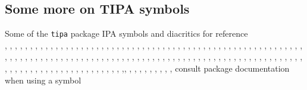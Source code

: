 \subsection{Some more on TIPA symbols}
\pex Some of the \verb=tipa= package IPA symbols and diacritics for reference\\
\a \textbabygamma, \textglotstop, \textrtailn, \textbarb, \texthalflength, \textrtailr, \textbarc, \texthardsign, \textrtails, \textbard, \texthooktop, \textrtailt, \textbardotlessj, \texthtb, \textrtailz, \textbarg, \texthtbardotlessj, \textrthook, \textbarglotstop, \texthtc, \textsca, \textbari, \texthtd, \textscb, \textbarl, \texthtg, \textsce, \textbaro, \texthth, \textscg, \textbarrevglotstop, \texththeng, \textsch, \textbaru, \texthtk, \textschwa, \textbeltl, \texthtp, \textsci, \textbeta, \texthtq, \textscj, \textbullseye, \texthtrtaild, \textscl, \textceltpal, \texthtscg, \textscn, \textchi, \texthtt, \textscoelig, \textcloseepsilon, \texthvlig, \textscomega, \textcloseomega, \textinvglotstop, \textscr, \textcloserevepsilon, \textinvscr, \textscripta, \textcommatailz, \textiota, \textscriptg, \textcorner, \textlambda, \textscriptv, \textcrb, \textlengthmark, \textscu, \textcrd, \textlhookt, \textscy, \textcrg, \textlhtlongi, \textsecstress, \textcrh, \textlhtlongy, \textsoftsign, \textcrinvglotstop, \textlonglegr, \textstretchc, \textcrlambda, \textlptr, \texttctclig, \textcrtwo, \textltailm, \textteshlig, \textctc, \textltailn, \texttheta, \textctd, \textltilde, \textthorn, \textctdctzlig, \textlyoghlig, \texttoneletterstem, \textctesh, \textObardotlessj, \texttslig, \textctj, \textOlyoghlig, \textturna, \textctn, \textomega, \textturncelig, \textctt, \textopencorner, \textturnh, \textcttctclig, \textopeno, \textturnk, \textctyogh, \textpalhook, \textturnlonglegr, \textctz, \textphi, \textturnm, \textdctzlig, \textpipe, \textturnmrleg, \textdoublebaresh, \textprimstress, \textturnr, \textdoublebarpipe, \textraiseglotstop, \textturnrrtail, \textdoublebarslash, \textraisevibyi, \textturnscripta, \textdoublepipe, \textramshorns, \textturnt, \textdoublevertline, \textrevapostrophe, \textturnv, \textdownstep, \textreve, \textturnw, \textdyoghlig, \textrevepsilon, \textturny, \textdzlig ,\textrevglotstop, \textupsilon, \textepsilon, \textrevyogh, \textupstep, \textesh, \textrhookrevepsilon, \textvertline, \textfishhookr, \textrhookschwa, \textvibyi
\a consult package documentation when using a symbol
\xe

